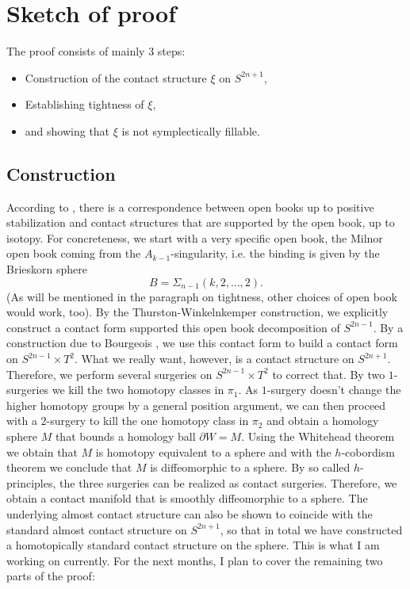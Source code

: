 \documentclass{amsart}
\begin{document}
\section*{Sketch of proof}
The proof consists of mainly 3 steps:
\begin{itemize}
    \item Construction of the contact structure $\xi$ on $S^{2n+1}$,
    \item Establishing tightness of $\xi$,
    \item and showing that $\xi$ is not symplectically fillable.
\end{itemize}
\subsection*{Construction}
According to \cite{Giroux02}, there is a correspondence between open books up to positive
stabilization and contact structures that are supported by the open book, up to isotopy.
For concreteness, we start with a very specific open book, the Milnor open book coming from
the $A_{k-1}$-singularity, i.e. the binding is given by the Brieskorn sphere 
\[
    B = \Sigma_{n-1}(k,2,\dots,2).
\]
(As will be mentioned in the paragraph on tightness, other choices of open book would work, too).
By the Thurston-Winkelnkemper construction, we explicitly construct a contact form supported
this open book decomposition of $S^{2n-1}$.
By a construction due to Bourgeois \cite{Bourgeois02}, we use this contact form to 
build a contact form on $S^{2n-1} \times T^2$.
What we really want, however, is a contact structure on $S^{2n+1}$. Therefore,
we perform several surgeries on $S^{2n-1}\times T^2$ to correct that.
By two $1$-surgeries we kill the two homotopy classes in $\pi_1$.
As $1$-surgery doesn't change the higher homotopy groups by a general position argument,
we can then proceed with a $2$-surgery to kill the one homotopy class in $\pi_2$
and obtain a homology sphere $M$ that bounds a homology ball $\partial W = M$.
Using the Whitehead theorem we obtain that $M$ is homotopy equivalent to a sphere 
and with the $h$-cobordism theorem we conclude that $M$ is diffeomorphic to a sphere.
By so called $h$-principles, the three surgeries can be realized as contact surgeries.
Therefore, we obtain a contact manifold that is smoothly diffeomorphic to a sphere.
The underlying almost contact structure can also be shown to coincide with the standard almost
contact structure on $S^{2n+1}$, so that in total we have constructed a
homotopically standard contact structure on the sphere.
This is what I am working on currently. For the next months, I plan to cover the remaining
two parts of the proof:
\end{document}
